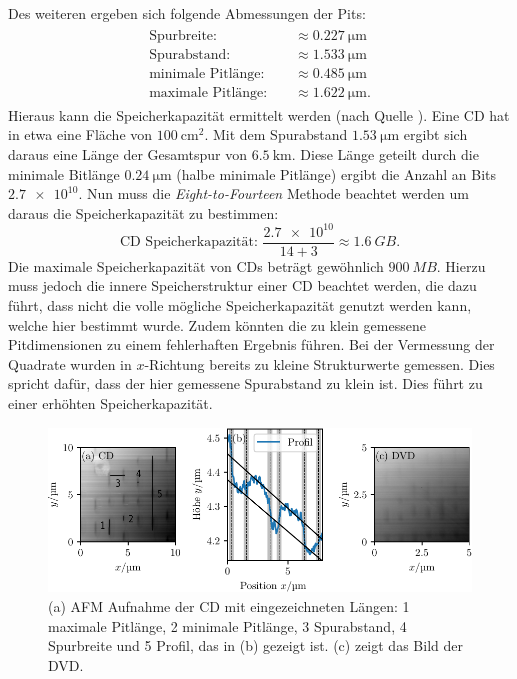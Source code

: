 Des weiteren ergeben sich folgende Abmessungen der Pits:
\begin{align}
  \begin{aligned}
    \text{Spurbreite: } &     &\approx  \SI{0.227}{\micro\meter}\\
    \text{Spurabstand: } &        &\approx \SI{1.533}{\micro\meter} \\
    \text{minimale Pitlänge: } &     &\approx \SI{0.485}{\micro\meter} \\
    \text{maximale Pitlänge: } &    &\approx \SI{1.622}{\micro\meter}.
  \end{aligned}
\end{align}
Hieraus kann die Speicherkapazität ermittelt werden (nach Quelle \cite{afm_datasheet}). Eine CD hat in etwa eine Fläche von $\SI{100}{\centi\meter\squared}$. Mit dem Spurabstand
$\SI{1.53}{\micro\meter}$ ergibt sich daraus
eine Länge der Gesamtspur von $\SI{6.5}{\kilo\meter}$. Diese Länge geteilt durch die minimale Bitlänge $\SI{0.24}{\micro\meter}$
(halbe minimale Pitlänge) ergibt die Anzahl an Bits $\num{2.7e10}$.
Nun muss die \textit{Eight-to-Fourteen}
Methode beachtet werden um daraus die Speicherkapazität zu bestimmen:
\begin{equation}
  \text{CD Speicherkapazität: } \frac{\num{2.7e10}}{14 + 3} \approx \SI{1.6}{GB}.
\end{equation}
Die maximale Speicherkapazität von CDs beträgt gewöhnlich $\SI{900}{MB}$. Hierzu muss jedoch die innere Speicherstruktur einer CD beachtet werden, die dazu führt,
dass nicht die volle mögliche Speicherkapazität genutzt werden kann, welche hier bestimmt wurde. Zudem könnten die zu klein gemessene Pitdimensionen
zu einem fehlerhaften Ergebnis führen. Bei der Vermessung der Quadrate wurden in $x$-Richtung bereits zu kleine Strukturwerte gemessen. Dies spricht dafür,
dass der hier gemessene Spurabstand zu klein ist. Dies führt zu einer erhöhten Speicherkapazität.

\begin{figure}
  \centering
  \includegraphics[scale = 1]{../analysis/data/cd/cd_profil.pdf}
  \caption{(a) AFM Aufnahme der CD mit eingezeichneten Längen: 1 maximale Pitlänge, 2 minimale Pitlänge,
  3 Spurabstand, 4 Spurbreite und 5 Profil, das in (b) gezeigt ist. (c) zeigt das Bild der DVD.}
  \label{fig: cd}
\end{figure}

